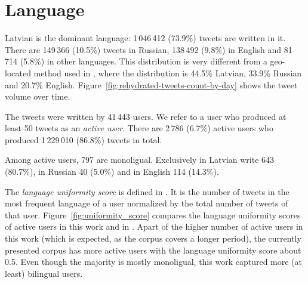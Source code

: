 \documentclass{IOS-Book-Article}
\newcommand{\hl}[1]{#1}
\begin{document}



\section{Language}
\label{sec:language}


Latvian is the dominant language: \hl{1\,046\,412 (73.9\%)} tweets are written in it.\footnotemark{} There are \hl{149\,366 (10.5\%)} tweets in Russian, \hl{138\,492 (9.8\%)} in English and \hl{81\,714 (5.8\%)} in other languages. This distribution is very different from a geo-located method used in \cite{milajevs:2017:BUCC}, where the distribution is 44.5\% Latvian, 33.9\% Russian and 20.7\% English. Figure~\ref{fig:rehydrated-tweets-count-by-day} shows the tweet volume over time.

The tweets were written by \hl{41\,443} users. We refer to a user who produced at least 50 tweets as an \textit{active user}. There are \hl{2\,786} (\hl{6.7\%}) active users who produced \hl{1\,229\,010} (\hl{86.8\%}) tweets in total.

Among active users, \hl{797} are monoligual. Exclusively in Latvian write \hl{643} (\hl{80.7\%}), in Russian \hl{40} (\hl{5.0\%}) and in English \hl{114} (\hl{14.3\%}).

The \textit{language uniformity score} is defined in \cite{milajevs:2017:BUCC}. It is the number of tweets in the most frequent language of a user normalized by the total number of tweets of that user. Figure~\ref{fig:uniformity_score} compares the language uniformity scores of active users in this work and in \cite{milajevs:2017:BUCC}. Apart of the higher number of active users in this work (which is expected, as the corpus covers a longer period), the currently presented corpus has more active users with the language uniformity score about 0.5. Even though the majority is mostly monoligual, this work captured more (at least) bilingual users.
\end{document}

